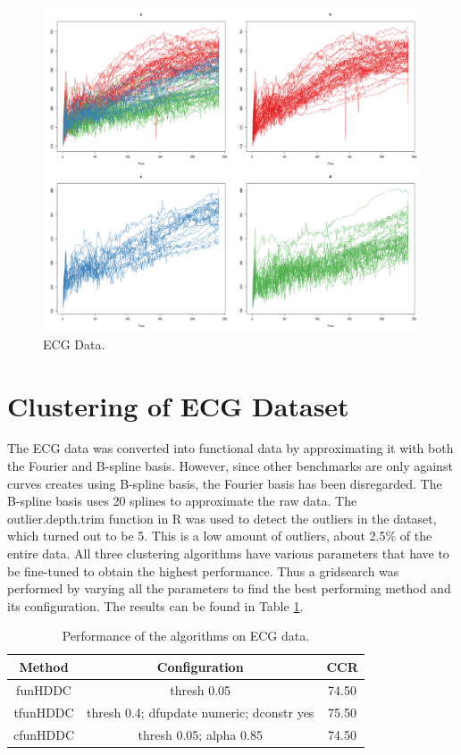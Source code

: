 \documentclass[]{article}
\begin{document}
\begin{figure}
	\centering
	\includegraphics[scale=0.25]{kneading_data.png}
	\caption{ECG Data.}
	\label{fig:kneading_data}
\end{figure}



\section{Clustering of ECG Dataset}

The ECG data was converted into functional data by approximating it with both the Fourier and B-spline basis. However, since other benchmarks are only against curves creates using B-spline basis, the Fourier basis has been disregarded. The B-spline basis uses 20 splines to approximate the raw data. The outlier.depth.trim function in R was used to detect the outliers in the dataset, which turned out to be 5. This is a low amount of outliers, about 2.5\% of the entire data. All three clustering algorithms have various parameters that have to be fine-tuned to obtain the highest performance. Thus a gridsearch was performed by varying all the parameters to find the best performing method and its configuration. The results can be found in Table \ref{tab:ecg_data}.

\begin{table}
	\centering
	\begin{tabular}{c c c} 
		\hline
		Method & Configuration & CCR \\ [0.5ex] 
		\hline
		funHDDC & thresh 0.05 & 74.50 \\ 
		
		tfunHDDC & thresh 0.4; dfupdate numeric; dconstr yes & 75.50 \\
		
		cfunHDDC & thresh 0.05; alpha 0.85 & 74.50 \\ [1ex] 
		\hline
	\end{tabular}
	\caption{Performance of the algorithms on ECG data.}
	\label{tab:ecg_data}
\end{table}
\end{document}
